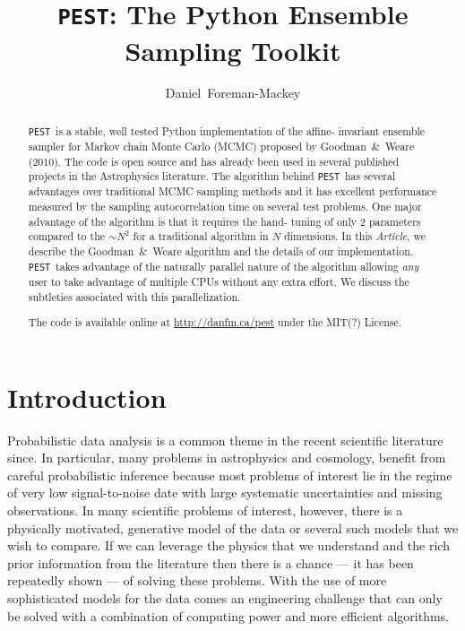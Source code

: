 \documentclass[12pt,preprint]{aastex}
\newcommand{\project}[1]{\texttt{#1}}
\newcommand{\this}{\project{PEST}}
\newcommand{\paper}{\emph{Article}}
\newcommand{\license}{MIT(?) License}
\begin{document}
\title{\this: The Python Ensemble Sampling Toolkit}
\author{Daniel~Foreman-Mackey}

\begin{abstract}

    \this~is a stable, well tested Python implementation of the affine-%
    invariant ensemble sampler for Markov chain Monte Carlo (MCMC)
    proposed by Goodman~\&~Weare (2010). The code is open source and has
    already been used in several published projects in the Astrophysics
    literature. The algorithm behind \this~has several advantages over
    traditional MCMC sampling methods and it has excellent performance
    measured by the sampling autocorrelation time on several test problems.
    One major advantage of the algorithm is that it requires the hand-%
    tuning of only 2 parameters compared to the $\sim N^2$ for
    a traditional algorithm in $N$ dimensions. In this \paper, we describe
    the Goodman~\&~Weare algorithm and the details of our implementation.
    \this~takes advantage of the naturally parallel nature of the algorithm
    allowing \emph{any} user to take advantage of multiple CPUs without any
    extra effort. We discuss the subtleties associated with this
    parallelization.

    The code is available online at \url{http://danfm.ca/pest} under the
    \license.

\end{abstract}


\section{Introduction}

Probabilistic data analysis is a common theme in the recent scientific
literature since. In particular, many problems in astrophysics and cosmology,
benefit from careful probabilistic inference because most problems of
interest lie in the regime of very low signal-to-noise date with large
systematic uncertainties and missing observations. In many scientific
problems of interest, however, there is a physically motivated,
generative model of the data or several
such models that we wish to compare. If we can leverage the physics that we
understand and the rich prior information from the literature then there is
a chance --- it has been repeatedly shown --- of solving these problems.
With the use of more sophisticated models for the data comes an engineering
challenge that can only be solved with a combination of computing power and
more efficient algorithms.
\end{document}
